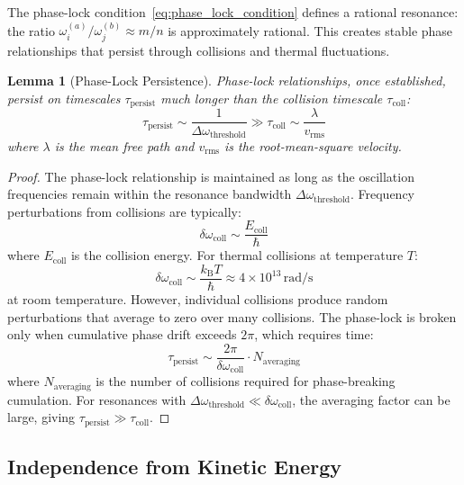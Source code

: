 \documentclass[twocolumn,showpacs,preprintnumbers,amsmath,amssymb,prd]{revtex4-2}
\newtheorem{lemma}[theorem]{Lemma}
\theoremstyle{definition}
\theoremstyle{remark}
\newcommand{\kB}{k_{\mathrm{B}}}
\begin{document}
The phase-lock condition~\eqref{eq:phase_lock_condition} defines a rational resonance: the ratio $\omega_i^{(a)}/\omega_j^{(b)} \approx m/n$ is approximately rational. This creates stable phase relationships that persist through collisions and thermal fluctuations.

\begin{lemma}[Phase-Lock Persistence]
\label{lem:persistence}
Phase-lock relationships, once established, persist on timescales $\tau_{\text{persist}}$ much longer than the collision timescale $\tau_{\text{coll}}$:
\begin{equation}
\tau_{\text{persist}} \sim \frac{1}{\Delta\omega_{\text{threshold}}} \gg \tau_{\text{coll}} \sim \frac{\lambda}{v_{\text{rms}}}
\label{eq:persistence}
\end{equation}
where $\lambda$ is the mean free path and $v_{\text{rms}}$ is the root-mean-square velocity.
\end{lemma}

\begin{proof}
The phase-lock relationship is maintained as long as the oscillation frequencies remain within the resonance bandwidth $\Delta\omega_{\text{threshold}}$. Frequency perturbations from collisions are typically:
\begin{equation}
\delta\omega_{\text{coll}} \sim \frac{E_{\text{coll}}}{\hbar}
\end{equation}
where $E_{\text{coll}}$ is the collision energy. For thermal collisions at temperature $T$:
\begin{equation}
\delta\omega_{\text{coll}} \sim \frac{\kB T}{\hbar} \approx 4 \times 10^{13} \, \text{rad/s}
\end{equation}
at room temperature. However, individual collisions produce random perturbations that average to zero over many collisions. The phase-lock is broken only when cumulative phase drift exceeds $2\pi$, which requires time:
\begin{equation}
\tau_{\text{persist}} \sim \frac{2\pi}{\delta\omega_{\text{coll}}} \cdot N_{\text{averaging}}
\end{equation}
where $N_{\text{averaging}}$ is the number of collisions required for phase-breaking cumulation. For resonances with $\Delta\omega_{\text{threshold}} \ll \delta\omega_{\text{coll}}$, the averaging factor can be large, giving $\tau_{\text{persist}} \gg \tau_{\text{coll}}$.
\end{proof}

\subsection{Independence from Kinetic Energy}
\end{document}
